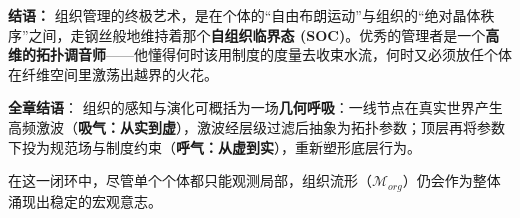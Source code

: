 \textbf{结语：}
组织管理的终极艺术，是在个体的“自由布朗运动”与组织的“绝对晶体秩序”之间，走钢丝般地维持着那个\textbf{自组织临界态 (SOC)}。优秀的管理者是一个\textbf{高维的拓扑调音师}——他懂得何时该用制度的度量去收束水流，何时又必须放任个体在纤维空间里激荡出越界的火花。


\textbf{全章结语}：
组织的感知与演化可概括为一场\textbf{几何呼吸}：一线节点在真实世界产生高频激波（\textbf{吸气：从实到虚}），激波经层级过滤后抽象为拓扑参数；顶层再将参数下投为规范场与制度约束（\textbf{呼气：从虚到实}），重新塑形底层行为。

在这一闭环中，尽管单个个体都只能观测局部，组织流形（$\mathcal{M}_{org}$）仍会作为整体涌现出稳定的宏观意志。
